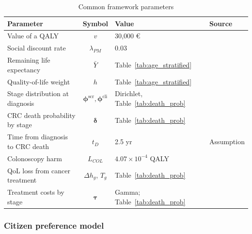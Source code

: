 \documentclass[12pt]{article}
\begin{document}
\begin{table}[htbp]
\centering
\footnotesize
\caption{Common framework parameters}
\label{tab:theta}
\begin{tabular}{l c l p{5cm}}
\toprule
\textbf{Parameter} & \textbf{Symbol} & \textbf{Value} & \textbf{Source} \\
\midrule
Value of a QALY & $v$ & 30{,}000 € & \citealp{vallejo2018estimating} \\
Social discount rate & $\lambda_{PM}$ & 0.03 & \citealp{lopez2010spanish} \\
Remaining life expectancy & $\bar Y$ & Table~\ref{tab:age_stratified} & \citealp{ine2024mortalidad} \\
Quality-of-life weight & $h$ & Table~\ref{tab:age_stratified} & \citealp{garcia2016normative} \\
Stage distribution at diagnosis & $\boldsymbol{\phi}^{\text{scr}}, \boldsymbol{\phi}^{\text{cli}}$ & Dirichlet, Table~\ref{tab:death_prob} & \citealp{cardoso2022overall} \\
CRC death probability by stage & $\boldsymbol{\delta}$ & Table~\ref{tab:death_prob} & \citealp{cardoso2022overall, ine2024mortalidad} \\
Time from diagnosis to CRC death & $t_D$ & 2.5 yr & Assumption\footnotemark \\
Colonoscopy harm & $L_{COL}$ & $4.07\times10^{-4}$ QALY & \citealp{reumkens2016post} \\
QoL loss from cancer treatment & $\Delta h_g$, $T_g$ & Table~\ref{tab:death_prob} & \citealp{djalalov2014review} \\
Treatment costs by stage & $\boldsymbol{\tau}$ & Gamma; Table~\ref{tab:death_prob} & \citealp{corral2015estimation} \\
\bottomrule
\end{tabular}
\end{table}



\subsubsection{Citizen preference model}\label{sec:citizen_model}
\end{document}
